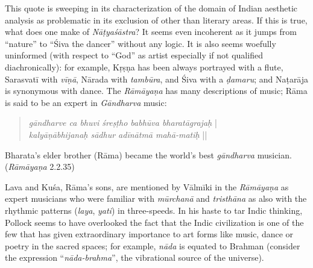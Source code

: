 This quote is sweeping in its characterization of the domain of Indian aesthetic analysis as problematic in its exclusion of other than literary areas. If this is true, what does one make of \textsl{Nāṭyaśāstra}? It seems even incoherent as it jumps from “nature” to “Śiva the dancer” without any logic. It is also seems woefully uninformed (with respect to “God” as artist especially if not qualified diachronically): for example, Kṛṣṇa has been always portrayed with a flute, Sarasvatī with \textsl{vīṇā}, Nārada with \textsl{tambūra}, and Śiva with a \textsl{ḍamaru}; and Naṭarāja is synonymous with dance. The \textsl{Rāmāyaṇa} has many descriptions of music; Rāma is said to be an expert in \textsl{Gāndharva} music:
\begin{quote}
\textsl{gāndharve ca bhuvi śreṣṭho babhūva bharatāgrajaḥ} |\\[2pt]
\textsl{kalyāṇābhijanaḥ sādhur adīnātmā mahā-matiḥ} ||
\end{quote}

\begin{myquote}
Bharata’s elder brother (Rāma) became the world’s best \textsl{gāndharva} musician. 
\hfill(\textsl{Rāmāyaṇa} 2.2.35)
\end{myquote}

Lava and Kuśa, Rāma’s sons, are mentioned by Vālmīki in the \textsl{Rāmāyaṇa} as expert musicians who were familiar with \textsl{mūrchanā} and \textsl{tristhāna} as also with the rhythmic patterns (\textsl{laya}, \textsl{yati}) in three-speeds.  In his haste to tar Indic thinking, Pollock seems to have overlooked the fact that the Indic civilization is one of the few that has given extraordinary importance to art forms like music, dance or poetry in the sacred spaces; for example, \textsl{nāda} is equated to Brahman (consider the expression ``\textsl{nāda-brahma}'', the vibrational source of the universe).\\[-20pt]

